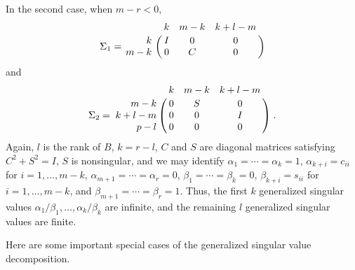 In the second case, when $m-r < 0$,
\[
\Sigma_1 = \bordermatrix{ & k & m-k & k+l-m \cr
                 \hfill k & I &  0  &   0   \cr
                      m-k & 0 &  C  &   0   }
\]
and
\[
\Sigma_2 = \bordermatrix{ & k & m-k & k+l-m \cr
               \hfill m-k & 0 &  S  &   0   \cr
                    k+l-m & 0 &  0  &   I   \cr
               \hfill p-l & 0 &  0  &   0   } \; .
\]
Again, $l$ is the rank of $B$, $k=r-l$, $C$ and $S$ are diagonal
matrices satisfying $C^2 + S^2 = I$, $S$ is nonsingular,
and we may identify
$\alpha_1 = \cdots = \alpha_k = 1$,
$\alpha_{k+i} = c_{ii}$ for $i=1, \ldots , m-k$,
$\alpha_{m+1} = \cdots = \alpha_r = 0$,
$\beta_1 = \cdots = \beta_k = 0$,
$\beta_{k+i} = s_{ii}$ for $i=1, \ldots , m-k$, and
$\beta_{m+1} = \cdots = \beta_r = 1$.
Thus, the first $k$ generalized singular values
$\alpha_1 / \beta_1 , \ldots , \alpha_k / \beta_k$
are infinite, and the remaining $l$ generalized singular values
are finite.

Here are some important special cases of the generalized singular value
decomposition.

